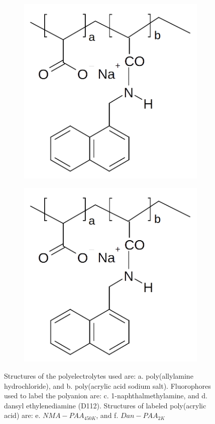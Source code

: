 \documentclass[journal=mamobx,manuscript=article]{achemso}
\begin{document}
\begin{figure}[H]
\begin{subfigure}[b]{0.3\textwidth}
        \includegraphics[scale=0.5]{fig1E.png}
        \caption{}
        \label{fig:E}
    \end{subfigure}
    \begin{subfigure}[b]{0.3\textwidth}
        \includegraphics[scale=0.5]{fig1E.png}
        \caption{}
        \label{fig:f}
    \end{subfigure}
    \caption{Structures of the polyelectrolytes used are: a. poly(allylamine hydrochloride), and b. poly(acrylic acid sodium salt).  Fluorophores used to label the polyanion are: c. 1-naphthalmethylamine, and d. dansyl ethylenediamine (D112).  Structures of labeled poly(acrylic acid) are: e. $NMA-PAA_{450K}$, and f. $Dan-PAA_{2K}$ }
    \label{figure 1}
\end{figure}
\end{document}
